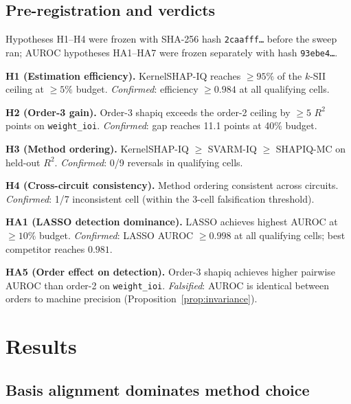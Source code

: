 \documentclass[11pt]{article}
\begin{document}
\subsection{Pre-registration and verdicts}

Hypotheses H1--H4 were frozen with SHA-256 hash
\texttt{2caafff\ldots} before the sweep ran; AUROC hypotheses
HA1--HA7 were frozen separately with hash \texttt{93ebe4\ldots}.

\textbf{H1 (Estimation efficiency).} KernelSHAP-IQ reaches
$\geq 95\%$ of the $k$-SII ceiling at $\geq 5\%$ budget.
\emph{Confirmed}: efficiency $\geq 0.984$ at all qualifying cells.

\textbf{H2 (Order-3 gain).} Order-3 shapiq exceeds the order-2
ceiling by $\geq 5$ $R^2$ points on \texttt{weight\_ioi}.
\emph{Confirmed}: gap reaches 11.1 points at 40\% budget.

\textbf{H3 (Method ordering).} KernelSHAP-IQ $\geq$ SVARM-IQ
$\geq$ SHAPIQ-MC on held-out $R^2$.
\emph{Confirmed}: 0/9 reversals in qualifying cells.

\textbf{H4 (Cross-circuit consistency).} Method ordering consistent
across circuits.
\emph{Confirmed}: 1/7 inconsistent cell (within the 3-cell
falsification threshold).

\textbf{HA1 (LASSO detection dominance).} LASSO achieves highest
AUROC at $\geq 10\%$ budget.
\emph{Confirmed}: LASSO AUROC $\geq 0.998$ at all qualifying cells;
best competitor reaches $0.981$.

\textbf{HA5 (Order effect on detection).} Order-3 shapiq achieves
higher pairwise AUROC than order-2 on \texttt{weight\_ioi}.
\emph{Falsified}: AUROC is identical between orders to machine
precision (Proposition~\ref{prop:invariance}).


\section{Results}
\label{sec:results}

\subsection{Basis alignment dominates method choice}
\label{sec:basis-alignment}
\end{document}
